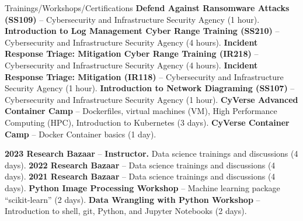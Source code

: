 \begin{rubric}{Trainings/Workshops/Certifications}
%
    \entry*[5/28/2025] \textbf{Defend Against Ransomware Attacks (SS109)} -- Cybersecurity and Infrastructure Security Agency (1 hour). \href{https://github.com/amantaya/curriculum-vitae/blob/master/certifications/SS109_MAY28-2025_CertificateofAttendance.pdf}{\scriptsize\faLink}
%
    \entry*[5/22/2025] \textbf{Introduction to Log Management Cyber Range Training (SS210)} -- Cybersecurity and Infrastructure Security Agency (4 hours). \href{https://github.com/amantaya/curriculum-vitae/blob/master/certifications/SS210_May22_2025_Course_Completion_Certificate.pdf}{\scriptsize\faLink}
%
    \entry*[5/15/2025] \textbf{Incident Response Triage: Mitigation Cyber Range Training (IR218)} -- Cybersecurity and Infrastructure Security Agency (4 hours). \href{https://github.com/amantaya/CV/blob/master/certifications/IR218_COA_051525.pdf}{\scriptsize\faLink}
%
    \entry*[5/12/2025] \textbf{Incident Response Triage: Mitigation (IR118)} -- Cybersecurity and Infrastructure Security Agency (1 hour). \href{https://github.com/amantaya/curriculum-vitae/blob/master/certifications/IR118_CoA_051225.pdf}{\scriptsize\faLink}
%
    \entry*[4/01/2025] \textbf{Introduction to Network Diagraming (SS107)} -- Cybersecurity and Infrastructure Security Agency (1 hour). \href{https://github.com/amantaya/CV/blob/master/certifications/SS107_APR1-2025_CertificateofAttendance.pdf}{\scriptsize\faLink}
%
    \entry*[5/2022] \textbf{CyVerse Advanced Container Camp} -- Dockerfiles, virtual machines (VM), High Performance Computing (HPC), Introduction to Kubernetes (3 days).
%
    \entry*[3/2021] \textbf{CyVerse Container Camp} -- Docker Container basics (1 day).

\entry*[4/2023] \textbf{2023 Research Bazaar} -- \textbf{Instructor.} Data science trainings and discussions (4 days).
\entry*[5/2022] \textbf{2022 Research Bazaar} -- Data science trainings and discussions (4 days).
\entry*[5/2021] \textbf{2021 Research Bazaar} -- Data science trainings and discussions (4 days).
\entry*[2/2020] \textbf{Python Image Processing Workshop} -- Machine learning package “scikit-learn” (2 days).
\entry*[2/2020] \textbf{Data Wrangling with Python Workshop} -- Introduction to shell, git, Python, and Jupyter Notebooks (2 days).


\end{rubric}
